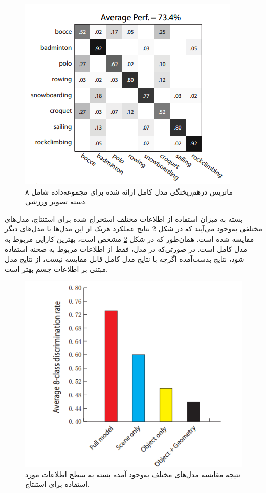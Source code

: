 \begin{enumerate}
	\begin{figure}[h]
		\center
		\includegraphics[scale=0.6]{./Imgs/li2007and_confmat.png}
		\caption[ماتریس درهم‌ریختگی مدل کامل ارائه شده در \cite{li2007and}]{ماتریس درهم‌ریختگی مدل کامل ارائه شده برای مجموعه‌داده شامل ۸ دسته تصویر ورزشی. \cite{li2007and}}
		\label{fig:liCM}
	\end{figure}
	
	بسته به میزان استفاده از اطلاعات مختلف استخراج شده برای استنتاج، مدل‌های مختلفی به‌وجود می‌آیند که در شکل
	\ref{fig:liCMP}
	نتایج عملکرد هریک از این مدل‌ها با مدل‌های دیگر مقایسه شده است.
	همان‌طور که در شکل \ref{fig:liCMP}
	مشخص است، بهترین کارایی مربوط به مدل کامل است. در صورتی‌که در مدل، فقط از اطلاعات مربوط به صحنه استفاده شود، نتایج بدست‌آمده اگرچه با نتایج مدل کامل قابل مقایسه نیست، از نتایج مدل مبتنی بر اطلاعات جسم بهتر است.
	
	\begin{figure}[h]
		\center
		\includegraphics[scale=0.4]{./Imgs/li2007and_compar.png}
		\caption[نتیجه مقایسه مدل‌های مختلف در \cite{li2007and}]{نتیجه مقایسه مدل‌های مختلف به‌وجود آمده بسته به سطح اطلاعات مورد استفاده برای استنتاج. \cite{li2007and}}
		\label{fig:liCMP}
	\end{figure}
	

\end{enumerate}
